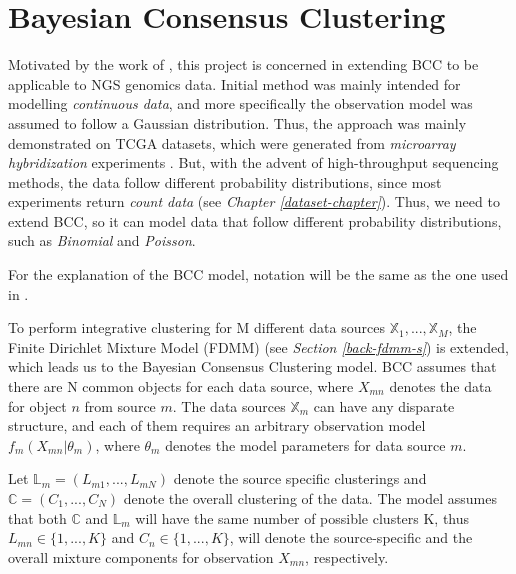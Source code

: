 \section{Bayesian Consensus Clustering} \label{integr-bcc-sect}
Motivated by the work of \citet{Lock2013}, this project is concerned in extending BCC to be applicable to NGS genomics data. Initial method was mainly intended for modelling \emph{continuous data}, and more specifically the observation model was assumed to follow a Gaussian distribution. Thus, the approach was mainly demonstrated on TCGA datasets, which were generated from \emph{microarray hybridization} experiments \citep{Babu2004}. But, with the advent of high-throughput sequencing methods, the data follow different probability distributions, since most experiments return \emph{count data} (see \emph{Chapter \ref{dataset-chapter}}). Thus, we need to extend BCC, so it can model data that follow different probability distributions, such as \emph{Binomial} and \emph{Poisson}.

For the explanation of the BCC model, notation will be the same as the one used in \citet{Lock2013}. 

To perform integrative clustering for M different data sources $\mathbb{X}_{1},..., \mathbb{X}_{M}$, the Finite Dirichlet Mixture Model (FDMM) (see \emph{Section \ref{back-fdmm-s}}) is extended, which leads us to the Bayesian Consensus Clustering model. BCC assumes that there are N common objects for each data source, where $X_{mn}$ denotes the data for object $n$ from source $m$. The data sources $\mathbb{X}_{m}$ can have any disparate structure, and each of them requires an arbitrary observation model $f_{m}(X_{mn}|\theta_{m})$, where $\theta_{m}$ denotes the model parameters for data source $m$.

Let $\mathbb{L}_{m} = (L_{m1},...,L_{mN})$ denote the source specific clusterings and $\mathbb{C} = (C_{1},...,C_{N})$ denote the overall clustering of the data. The model assumes that both $\mathbb{C}$ and $\mathbb{L}_{m}$ will have the same number of possible clusters K, thus $L_{mn} \in \lbrace 1,...,K \rbrace$ and $C_{n} \in \lbrace 1,...,K \rbrace$, will denote the source-specific and the overall mixture components for observation $X_{mn}$, respectively.

